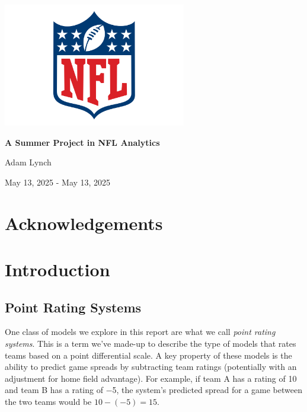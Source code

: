 \documentclass{report}
\begin{document}
\begin{titlepage}
    \centering

    \includegraphics[width=8cm]{images/nfl_logo.png}\par\vspace{1cm}

    \vspace{0.5cm}
    {\huge\bfseries A Summer Project in NFL Analytics \par}
    \vspace{2cm}

    {\Large Adam Lynch \par}
    \vspace{1cm}

    {\large May 13, 2025 - May 13, 2025 \par}

    \vfill
\end{titlepage}

\chapter*{Acknowledgements}

\tableofcontents
\newpage

\chapter{Introduction}

\section{Point Rating Systems}

One class of models we explore in this report are what we call \textit{point rating systems}.
This is a term we've made-up to describe the type of models that rates teams based on a point differential scale.
A key property of these models is the ability to predict game spreads by subtracting team ratings (potentially with an adjustment for home field advantage).
For example, if team A has a rating of 10 and team B has a rating of $-$5, the system's predicted spread for a game between the two teams would be $10 - (-5)=15$.
\end{document}
